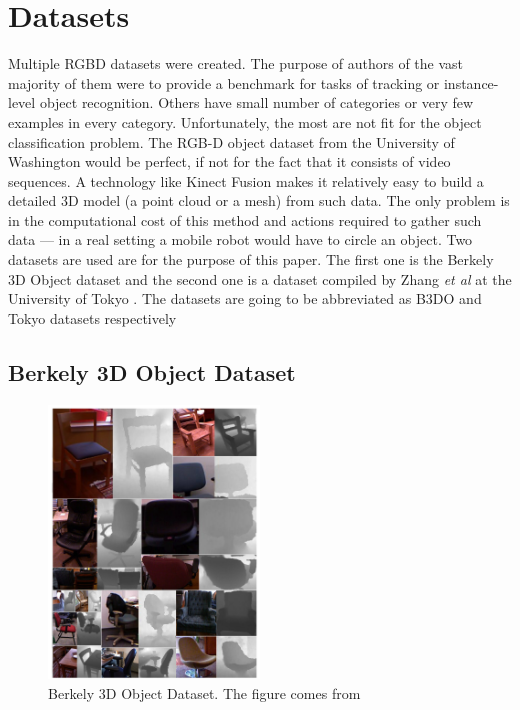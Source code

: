 \section{Datasets}

	Multiple RGBD datasets were created. The purpose of authors of the vast majority of them were to provide a benchmark for tasks of tracking or instance-level object recognition. Others have small number of categories or very few examples in every category. Unfortunately, the most are not fit for the object classification problem.
	The RGB-D object dataset from the University of Washington \cite{dataset_washington} would be perfect, if not for the fact that it consists of video sequences. A technology like Kinect Fusion \cite{KinectFusion} makes it relatively easy to build a detailed 3D model (a point cloud or a mesh) from such data. The only problem is in the computational cost of this method and actions required to gather such data --- in a real setting a mobile robot would have to circle an object. Two datasets are used are for the purpose of this paper. The first one is the Berkely 3D Object dataset \cite{B3DO} and the second one is a dataset compiled by Zhang \emph{et al} at the University of Tokyo \cite{zhangcategory}. The datasets are going to be abbreviated as B3DO and Tokyo datasets respectively


	\subsection{Berkely 3D Object Dataset}
	\begin{figure}[!ht]
	\centering
	\includegraphics[width=0.5\textwidth]{figs/b3do_dataset}
	\caption{Berkely 3D Object Dataset. The figure comes from \cite{B3DO}}
	\label{fig:b3do}
	\end{figure}
	
